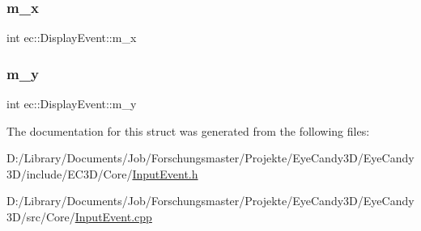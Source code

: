 \subsubsection{\texorpdfstring{m\+\_\+x}{m\_x}}
{\footnotesize\ttfamily int ec\+::\+Display\+Event\+::m\+\_\+x}

\mbox{\label{structec_1_1_display_event_aa4314e0538f9929b39e37bb400ac2220}} 
\subsubsection{\texorpdfstring{m\+\_\+y}{m\_y}}
{\footnotesize\ttfamily int ec\+::\+Display\+Event\+::m\+\_\+y}



The documentation for this struct was generated from the following files\+:\begin{DoxyCompactItemize}
\item 
D\+:/\+Library/\+Documents/\+Job/\+Forschungsmaster/\+Projekte/\+Eye\+Candy3\+D/\+Eye\+Candy3\+D/include/\+E\+C3\+D/\+Core/\mbox{\hyperlink{_input_event_8h}{Input\+Event.\+h}}\item 
D\+:/\+Library/\+Documents/\+Job/\+Forschungsmaster/\+Projekte/\+Eye\+Candy3\+D/\+Eye\+Candy3\+D/src/\+Core/\mbox{\hyperlink{_input_event_8cpp}{Input\+Event.\+cpp}}\end{DoxyCompactItemize}

